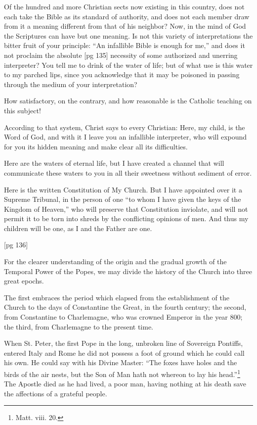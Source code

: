 Of the hundred and more Christian sects now
existing in this country, does not each take the
Bible as its standard of authority, and does not
each member draw from it a meaning different
from that of his neighbor? Now, in the mind of
God the Scriptures can have but one meaning. Is
not this variety of interpretations the bitter fruit
of your principle: “An infallible Bible is enough
for me,” and does it not proclaim the absolute
[pg 135]
necessity of some authorized and unerring interpreter?
You tell me to drink of the water of life;
but of what use is this water to my parched lips,
since you acknowledge that it may be poisoned in
passing through the medium of your interpretation?

How satisfactory, on the contrary, and how reasonable
is the Catholic teaching on this subject!

According to that system, Christ says to every
Christian: Here, my child, is the Word of God,
and with it I leave you an infallible interpreter,
who will expound for you its hidden meaning and
make clear all its difficulties.

Here are the waters of eternal life, but I have
created a channel that will communicate these
waters to you in all their sweetness without sediment
of error.

Here is the written Constitution of My Church.
But I have appointed over it a Supreme Tribunal,
in the person of one “to whom I have given the
keys of the Kingdom of Heaven,” who will preserve
that Constitution inviolate, and will not permit
it to be torn into shreds by the conflicting
opinions of men. And thus my children will be
one, as I and the Father are one.

[pg 136]



For the clearer understanding of the origin and
the gradual growth of the Temporal Power of
the Popes, we may divide the history of the
Church into three great epochs.

The first embraces the period which elapsed
from the establishment of the Church to the days
of Constantine the Great, in the fourth century;
the second, from Constantine to Charlemagne,
who was crowned Emperor in the year 800; the
third, from Charlemagne to the present time.

When St. Peter, the first Pope in the long, unbroken
line of Sovereign Pontiffs, entered Italy
and Rome he did not possess a foot of ground
which he could call his own. He could say with
his Divine Master: “The foxes have holes and
the birds of the air nests, but the Son of Man
hath not whereon to lay his head.”\footnote{Matt.
viii. 20.} The Apostle
died as he had lived, a poor man, having nothing
at his death save the affections of a grateful
people.

